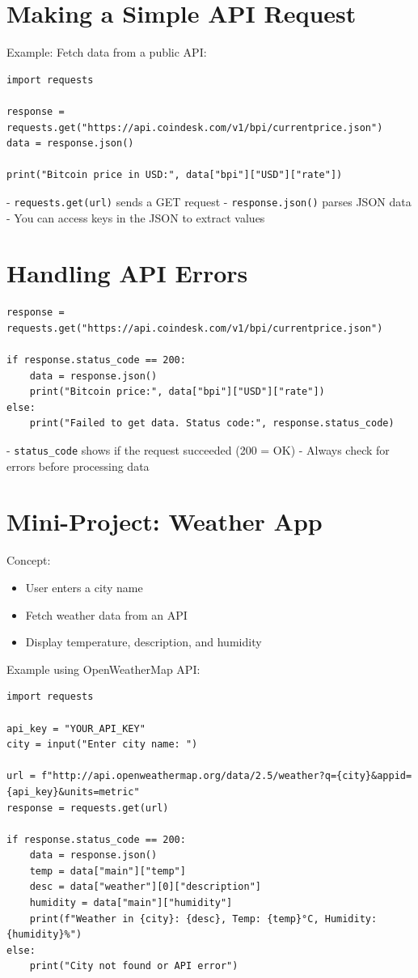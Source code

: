 \section{Making a Simple API Request}

Example: Fetch data from a public API:

\begin{verbatim}
import requests

response = requests.get("https://api.coindesk.com/v1/bpi/currentprice.json")
data = response.json()

print("Bitcoin price in USD:", data["bpi"]["USD"]["rate"])
\end{verbatim}

- \texttt{requests.get(url)} sends a GET request  
- \texttt{response.json()} parses JSON data  
- You can access keys in the JSON to extract values  

\section{Handling API Errors}

\begin{verbatim}
response = requests.get("https://api.coindesk.com/v1/bpi/currentprice.json")

if response.status_code == 200:
    data = response.json()
    print("Bitcoin price:", data["bpi"]["USD"]["rate"])
else:
    print("Failed to get data. Status code:", response.status_code)
\end{verbatim}

- \texttt{status\_code} shows if the request succeeded (200 = OK)  
- Always check for errors before processing data  

\section{Mini-Project: Weather App}

Concept:

\begin{itemize}
    \item User enters a city name  
    \item Fetch weather data from an API  
    \item Display temperature, description, and humidity  
\end{itemize}

Example using OpenWeatherMap API:

\begin{verbatim}
import requests

api_key = "YOUR_API_KEY"
city = input("Enter city name: ")

url = f"http://api.openweathermap.org/data/2.5/weather?q={city}&appid={api_key}&units=metric"
response = requests.get(url)

if response.status_code == 200:
    data = response.json()
    temp = data["main"]["temp"]
    desc = data["weather"][0]["description"]
    humidity = data["main"]["humidity"]
    print(f"Weather in {city}: {desc}, Temp: {temp}°C, Humidity: {humidity}%")
else:
    print("City not found or API error")
\end{verbatim}

